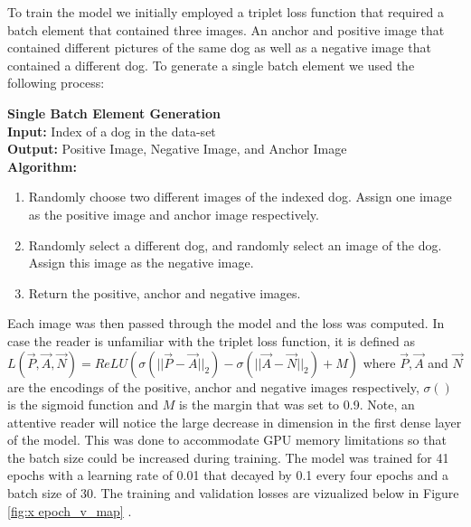 \documentclass{article}
\begin{document}
To train the model we initially employed a triplet loss function that required a batch element that contained three images.  An anchor and positive image that contained different pictures of the same dog as well as a negative image that contained a different dog.  To generate a single batch element we used the following process: \\


    \begin{minipage}{1\textwidth}%
     \noindent \textbf{Single Batch Element Generation}  \\
    
      \noindent \textbf{Input:} Index of a dog in the data-set \\
      
      \noindent \textbf{Output:} Positive Image, Negative Image, and Anchor Image \\
      
      \noindent \textbf{Algorithm:} \\
    \end{minipage}%
    
    \begin{enumerate}
    
      \item Randomly choose two different images of the indexed dog.  Assign one image as the positive image and anchor image respectively. 
    
      \item Randomly select a different dog, and randomly select an image of the dog.  Assign this image as the negative image.
      
      \item Return the positive, anchor and negative images.
    
    \end{enumerate}

Each image was then passed through the model and the loss was computed.  In case the reader is unfamiliar with the triplet loss function,  it is defined as $L(\vec{P}, \vec{A}, \vec{N}) = ReLU(\sigma(||\vec{P}-\vec{A}||_2) - \sigma(||\vec{A}- \vec{N}||_2) + M)$ where $\vec{P}, \vec{A}$ and $\vec{N}$ are the encodings of the positive, anchor and negative images respectively, $\sigma()$ is the sigmoid function and $M$ is the margin that was set to 0.9.  Note, an attentive reader will notice the large decrease in dimension in the first dense layer of the model.  This was done to accommodate GPU memory limitations so that the batch size could be increased during training.   The model was trained for 41 epochs with a learning rate of 0.01 that decayed by 0.1 every four epochs and a batch size of 30.  The training and validation losses are vizualized below in Figure \ref{fig:x epoch_v_map} .
\end{document}
